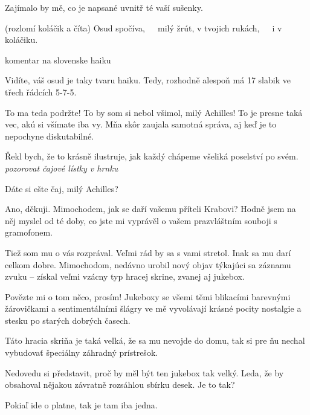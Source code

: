\documentclass[12pt]{article}
\begin{document}
\begin{description}[itemsep=0pt]
\item[A:] Zajímalo by mě, co je napsané uvnitř té vaší sušenky.

\item[Ž:] (rozlomí koláčik a číta) Osud spočíva,\ \ \ milý žrút, v tvojich rukách,\ \ \ i v koláčiku.

\item[TODO] komentar na slovenske haiku

\item[A:] Vidíte, váš osud je taky tvaru haiku. Tedy, rozhodně alespoň má
    17 slabik ve třech řádcích 5-7-5.

\item[Ž:] To ma teda podržte! To by som si nebol všimol, milý Achilles! To je presne 
    taká vec, akú si všímate iba vy. Mňa skôr zaujala samotná správa, aj keď je 
    to nepochyne diskutabilné.

\item[A:] Řekl bych, že to krásně ilustruje, jak každý chápeme všeliká poselství
    po svém. \textit{pozorovat čajové lístky v hrnku}

\item[ž:] Dáte si ešte čaj, milý Achilles?

\item[A:] Ano, děkuji. Mimochodem, jak se daří vašemu příteli Krabovi? Hodně jsem na něj
    myslel od té doby, co jste mi vyprávěl o vašem prazvláštním souboji s gramofonem.

\item[Ž:] Tiež som mu o vás rozprával. Veľmi rád by sa s vami stretol. Inak sa mu darí 
    celkom dobre. Mimochodom, nedávno urobil nový objav týkajúci sa záznamu zvuku -- získal 
    veľmi vzácny typ hracej skrine, zvanej aj jukebox.

\item[A:] Povězte mi o tom něco, prosím! Jukeboxy se všemi těmi blikacími barevnými
    žárovičkami a sentimentálními šlágry ve mě vyvolávají krásné pocity nostalgie
    a stesku po starých dobrých časech.

\item[Ž:] Táto hracia skriňa je taká veľká, že sa mu nevojde do domu, tak si pre ňu 
    nechal vybudovať špeciálny záhradný prístrešok. 

\item[A:] Nedovedu si představit, proč by měl být ten jukebox tak velký.
    Leda, že by obsahoval nějakou závratně rozsáhlou sbírku desek. Je to tak?

\item[Ž:] Pokiaľ ide o platne, tak je tam iba jedna.


\end{description}
\end{document}
